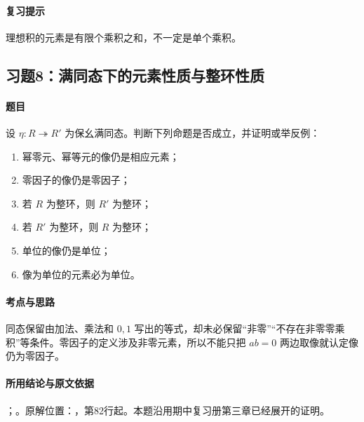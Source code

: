 \paragraph{复习提示}

理想积的元素是有限个乘积之和，不一定是单个乘积。



\subsection{习题8：满同态下的元素性质与整环性质}

\label{ex:3:8}

\paragraph{题目}

设 $\eta:R\twoheadrightarrow R'$ 为保幺满同态。判断下列命题是否成立，并证明或举反例：
\begin{enumerate}
  \item[(i)] 幂零元、幂等元的像仍是相应元素；
  \item[(ii)] 零因子的像仍是零因子；
  \item[(iii)] 若 $R$ 为整环，则 $R'$ 为整环；
  \item[(iv)] 若 $R'$ 为整环，则 $R$ 为整环；
  \item[(v)] 单位的像仍是单位；
  \item[(vi)] 像为单位的元素必为单位。
\end{enumerate}

\paragraph{考点与思路}

同态保留由加法、乘法和 $0,1$ 写出的等式，却未必保留“非零”“不存在非零零乘积”等条件。零因子的定义涉及非零元素，所以不能只把 $ab=0$ 两边取像就认定像仍为零因子。

\paragraph{所用结论与原文依据}

；。原解位置：，第82行起。本题沿用期中复习册第三章已经展开的证明。


